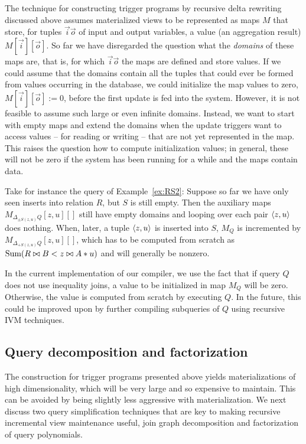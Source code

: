 The technique for constructing trigger programs by recursive delta rewriting discussed above assumes
materialized views to be represented as maps $M$ that store, for tuples $\vec{i}\vec{o}$ of input and output variables, a value (an aggregation result) $M[\vec{i}][\vec{o}]$.
So far we have disregarded the question what the {\em domains} of these maps are, that is,
for which $\vec{i}\vec{o}$ the maps are defined and store values.
If we could assume that the domains contain all the tuples that could ever be formed from values occurring
in the database, we could initialize the map values to zero, $M[\vec{i}][\vec{o}] := 0$,
before the first update is fed into the system.
%
However, it is not feasible to assume such large or even infinite domains.
Instead, we want to start with empty maps and extend the domains when the update triggers want to access
values -- for reading or writing -- that are not yet represented in the map.
This raises the question how to compute initialization values; in general, these will not be zero if 
the system has been running for a while and the maps contain data.

Take for instance the query of Example~\ref{ex:RS2}: Suppose so far we have only seen inserts into relation $R$,
but $S$ is still empty. Then the auxiliary maps $M_{\Delta_{\pm S(z,u)} Q}[z,u][]$ still have empty domains and
looping over each pair ${\langle z,u\rangle}$ does nothing. When, later, a tuple ${\langle z,u\rangle}$ is inserted into $S$,
$M_Q$ is incremented by $M_{\Delta_{+S(z,u)} Q}[z,u][]$, which has to be computed from scratch as
$\mbox{Sum}(R \bowtie B < z \bowtie A*u)$ and will generally be nonzero.

In the current implementation of our compiler, we use the fact that if query $Q$ does not use inequality joins,
a value to be initialized in map $M_Q$
will be zero. Otherwise, the value is computed from scratch by executing $Q$.
In the future, this could be improved upon by further compiling subqueries of $Q$ using
recursive IVM techniques.


\subsection{Query decomposition and factorization}
\label{sec:simplification}


The construction for trigger programs presented above yields 
materializations of high dimensionality, which will be very large and so expensive to maintain.
This can be avoided by being slightly less aggressive with materialization.
We next discuss two query simplification techniques that are key to making
recursive incremental view maintenance useful, join graph decomposition and factorization
of query polynomials.


